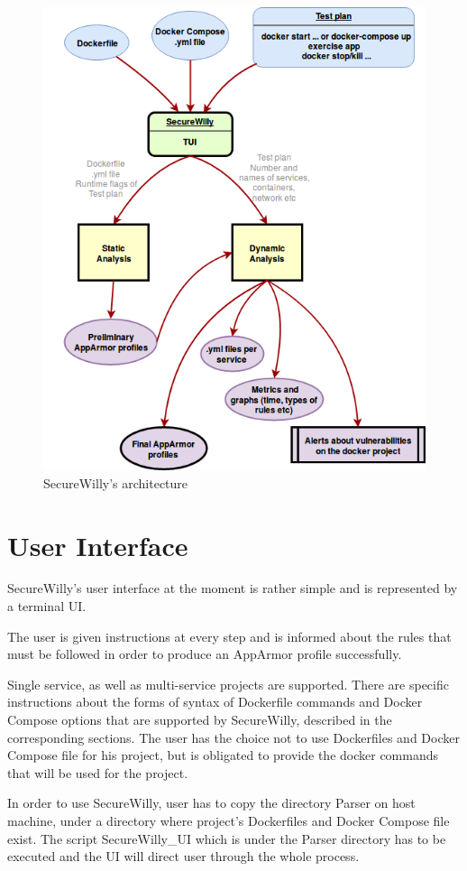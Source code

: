 \begin{figure}[h!]
   \centering
   \includegraphics[width=0.8\linewidth]{../figures/SecureWilly.png}
   \caption{SecureWilly's architecture}
\end{figure}

\section{User Interface}

SecureWilly's user interface at the moment is rather simple and is represented by a terminal UI.

The user is given instructions at every step and is informed about the rules that must be followed in order to produce an AppArmor profile successfully.

Single service, as well as multi-service projects are supported. There are specific instructions about the forms of syntax of Dockerfile commands and Docker Compose options that are supported by SecureWilly, described in the corresponding sections. The user has the choice not to use Dockerfiles and Docker Compose file for his project, but is obligated to provide the docker commands that will be used for the project.

In order to use SecureWilly, user has to copy the directory Parser on host machine, under a directory where project's Dockerfiles and Docker Compose file exist. The script SecureWilly\_UI which is under the Parser directory has to be executed and the UI will direct user through the whole process.


